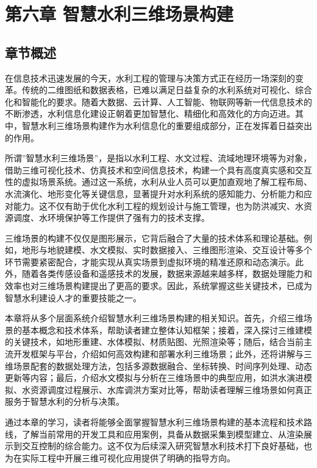 \section{第六章
智慧水利三维场景构建}\label{ux7b2cux516dux7ae0-ux667aux6167ux6c34ux5229ux4e09ux7ef4ux573aux666fux6784ux5efa}

\subsection{章节概述}\label{ux7ae0ux8282ux6982ux8ff0}

在信息技术迅速发展的今天，水利工程的管理与决策方式正在经历一场深刻的变革。传统的二维图纸和数据表格，已难以满足日益复杂的水利系统对可视化、综合化和智能化的要求。随着大数据、云计算、人工智能、物联网等新一代信息技术的不断渗透，水利信息化建设正朝着更加智慧化、精细化和高效化的方向迈进。其中，智慧水利三维场景构建作为水利信息化的重要组成部分，正在发挥着日益突出的作用。

所谓''智慧水利三维场景''，是指以水利工程、水文过程、流域地理环境等为对象，借助三维可视化技术、仿真技术和空间信息技术，构建一个具有高度真实感和交互性的虚拟场景系统。通过这一系统，水利从业人员可以更加直观地了解工程布局、水流演化、地形变化等关键信息，显著提升对水利系统的感知能力、分析能力和应对能力。这不仅有助于优化水利工程的规划设计与施工管理，也为防洪减灾、水资源调度、水环境保护等工作提供了强有力的技术支撑。

三维场景的构建不仅仅是图形展示，它背后融合了大量的技术体系和理论基础。例如，地形与地貌建模、水文模拟、实时数据接入、三维图形渲染、交互设计等多个环节需要紧密配合，才能实现从真实场景到虚拟环境的精准还原和动态演示。此外，随着各类传感设备和遥感技术的发展，数据来源越来越多样，数据处理能力和效率也对三维场景构建提出了更高的要求。因此，系统掌握这些关键技术，已成为智慧水利建设人才的重要技能之一。

本章将从多个层面系统介绍智慧水利三维场景构建的相关知识。首先，介绍三维场景的基本概念和技术体系，帮助读者建立整体认知框架；接着，深入探讨三维建模的关键技术，如地形重建、水体模拟、材质贴图、光照渲染等；随后，结合当前主流开发框架与平台，介绍如何高效构建和部署水利三维场景；此外，还将讲解与三维场景配套的数据处理方法，包括多源数据融合、坐标转换、时间序列处理、动态更新等内容；最后，介绍水文模拟与分析在三维场景中的典型应用，如洪水演进模拟、水资源调度过程展示、水库调洪方案对比等，帮助读者理解三维场景如何真正服务于智慧水利的分析与决策。

通过本章的学习，读者将能够全面掌握智慧水利三维场景构建的基本流程和技术路线，了解当前常用的开发工具和应用案例，具备从数据采集到模型建立、从渲染展示到交互控制的综合能力。这不仅为后续深入研究智慧水利技术打下良好基础，也为在实际工程中开展三维可视化应用提供了明确的指导方向。

